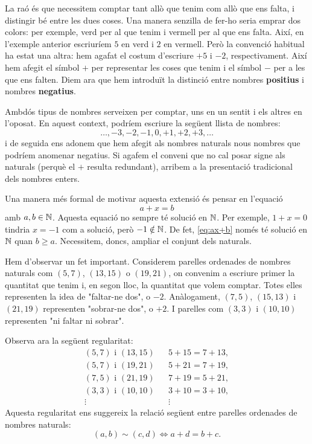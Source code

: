 La raó és que necessitem comptar tant allò que tenim com allò que ens falta, i distingir bé entre les dues coses. Una manera senzilla de fer-ho seria emprar dos colors: per exemple, verd per al que tenim i vermell per al que ens falta. Així, en l'exemple anterior escriuríem $5$ en verd i $2$ en vermell. Però la convenció habitual ha estat una altra: hem agafat el costum d'escriure $+5$ i $-2$, respectivament. Així hem afegit el símbol $+$ per representar les coses que tenim i el símbol $-$ per a les que ens falten. Diem ara que hem introduït la distinció entre nombres \textbf{positius} i nombres \textbf{negatius}.

Ambdós tipus de nombres serveixen per comptar, uns en un sentit i els altres en l'oposat. En aquest context, podríem escriure la següent llista de nombres:
\[
\ldots,-3,-2,-1,0,+1,+2,+3,\ldots
\]
i de seguida ens adonem que hem afegit als nombres naturals nous nombres que podríem anomenar negatius. Si agafem el conveni que no cal posar signe als naturals (perquè el $+$ resulta redundant), arribem a la presentació tradicional dels nombres enters.

Una manera més formal de motivar aquesta extensió és pensar en l'equació
\begin{equation}\label{eq:ax+b}
a+x=b
\end{equation}
amb $a,b\in \mathbb{N}$. Aquesta equació no sempre té solució en $\mathbb{N}$. Per exemple, $1+x=0$ tindria $x=-1$ com a solució, però $-1\notin \mathbb{N}$. De fet, \eqref{eq:ax+b} només té solució en $\mathbb{N}$ quan $b\geq a$. Necessitem, doncs, ampliar el conjunt dels naturals.

Hem d'observar un fet important. Considerem parelles ordenades de nombres naturals com $(5,7)$, $(13,15)$ o $(19,21)$, on convenim a escriure primer la quantitat que tenim i, en segon lloc, la quantitat que volem comptar. Totes elles representen la idea de "faltar-ne dos", o $-2$. Anàlogament, $(7,5)$, $(15,13)$ i $(21,19)$ representen "sobrar-ne dos", o $+2$. I parelles com $(3,3)$ i $(10,10)$ representen "ni faltar ni sobrar".

Observa ara la següent regularitat:
\[
\begin{array}{ccc}
(5,7) \text{ i } (13,15) && 5+15=7+13,\\
(5,7) \text{ i } (19,21) && 5+21=7+19,\\
(7,5) \text{ i } (21,19) && 7+19=5+21,\\
(3,3) \text{ i } (10,10) && 3+10=3+10,\\
\vdots && \vdots
\end{array}
\]
Aquesta regularitat ens suggereix la relació següent entre parelles ordenades de nombres naturals:
\[
(a,b)\sim (c,d) \iff a+d=b+c.
\]

